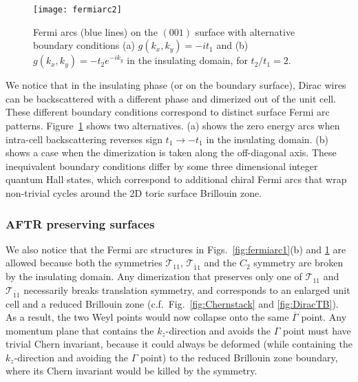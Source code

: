 \begin{figure}[htbp]\centering\texttt{[image: fermiarc2]}\caption[Fermi arcs on the $(001)$ surface with alternative boundary conditions]{Fermi arcs (blue lines) on the $(001)$ surface with alternative boundary conditions (a) $g(k_x,k_y)=-it_1$ and (b) $g(k_x,k_y)=-t_2e^{-ik_y}$ in the insulating domain, for $t_2/t_1=2$.}\label{fig:fermiarc2}\end{figure}

We notice that in the insulating phase (or on the boundary surface), Dirac wires can be backscattered with a different phase and dimerized out of the unit cell. These different boundary conditions correspond to distinct surface Fermi arc patterns. Figure~\ref{fig:fermiarc2} shows two alternatives. (a) shows the zero energy arcs when intra-cell backscattering reverses sign $t_1\to-t_1$ in the insulating domain. (b) shows a case when the dimerization is taken along the off-diagonal axis. These inequivalent boundary conditions differ by some three dimensional integer quantum Hall states, which correspond to additional chiral Fermi arcs that wrap non-trivial cycles around the 2D toric surface Brillouin zone.

\subsubsection{AFTR preserving surfaces}\label{sec:fermiarcAFTRpreserving}

We also notice that the Fermi arc structures in Figs.~\ref{fig:fermiarc1}(b) and \ref{fig:fermiarc2} are allowed because both the \AFTR symmetries $\mathcal{T}_{11}$, $\mathcal{T}_{\bar{1}1}$ and the $C_2$ symmetry are broken by the insulating domain. Any dimerization that preserves only one of $\mathcal{T}_{11}$ and $\mathcal{T}_{\bar{1}1}$ necessarily breaks translation symmetry, and corresponds to an enlarged unit cell and a reduced Brillouin zone (c.f.~Fig.~\ref{fig:Chernstack} and \ref{fig:DiracTB}). As a result, the two Weyl points would now collapse onto the same $\overline{\Gamma}$ point. Any momentum plane that contains the $k_z$-direction and avoids the $\Gamma$ point must have trivial Chern invariant, because it could always be deformed (while containing the $k_z$-direction and avoiding the $\Gamma$ point) to the reduced Brillouin zone boundary, where its Chern invariant would be killed by the \AFTR symmetry. %

